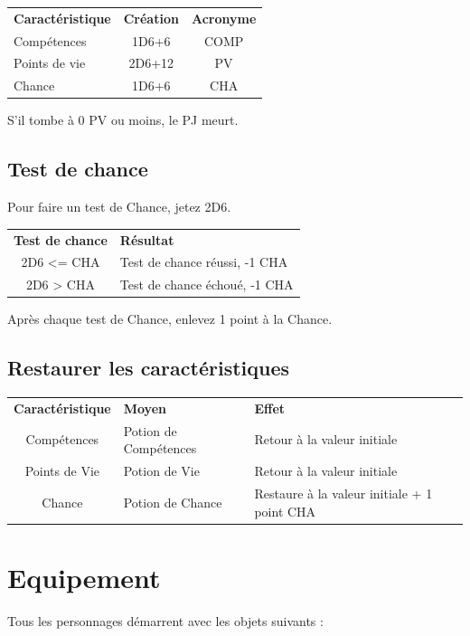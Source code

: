 \documentclass[a4paper, 11pt, twoside]{article}
\begin{document}
\newpage

\begin{longtable}{lcc}
\textbf{Caractéristique} & \textbf{Création} & \textbf{Acronyme}\\
Compétences & 1D6+6 & COMP\\
Points de vie & 2D6+12 & PV\\
Chance & 1D6+6 & CHA\\
\end{longtable}

S'il tombe à 0 PV ou moins, le PJ meurt.

\subsection{Test de chance}
\label{sec:org518167e}

Pour faire un test de Chance, jetez 2D6.

\begin{longtable}{cl}
\textbf{Test de chance} & \textbf{Résultat}\\
2D6 <= CHA & Test de chance réussi, -1 CHA\\
2D6 > CHA & Test de chance échoué, -1 CHA\\
\end{longtable}

Après chaque test de Chance, enlevez 1 point à la Chance.

\subsection{Restaurer les caractéristiques}
\label{sec:org400c5c9}

\begin{longtable}{cll}
\textbf{Caractéristique} & \textbf{Moyen} & \textbf{Effet}\\
Compétences & Potion de Compétences & Retour à la valeur initiale\\
Points de Vie & Potion de Vie & Retour à la valeur initiale\\
Chance & Potion de Chance & Restaure à la valeur initiale + 1 point CHA\\
\end{longtable}

\section{Equipement}
\label{sec:org13f2276}

Tous les personnages démarrent avec les objets suivants :
\end{document}
